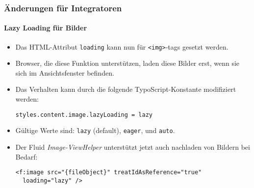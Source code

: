 
\begin{frame}[fragile]
	\frametitle{Änderungen für Integratoren}
	\framesubtitle{Lazy Loading für Bilder}

	\lstset{basicstyle=\smaller\ttfamily}

	\begin{itemize}
		\item Das HTML-Attribut \texttt{loading} kann nun für \texttt{<img>}-tags gesetzt werden.
		\item Browser, die diese Funktion unterstützen, laden diese Bilder erst, wenn sie sich im Ansichtsfenster befinden.
		\item Das Verhalten kann durch die folgende TypoScript-Konstante modifiziert werden:

\vspace{-0.4cm}
\begin{lstlisting}
styles.content.image.lazyLoading = lazy
\end{lstlisting}

		\item Gültige Werte sind: \texttt{lazy} (default), \texttt{eager}, und \texttt{auto}.
		\item Der Fluid \textit{Image-ViewHelper} unterstützt jetzt auch nachladen von Bildern bei Bedarf:

\vspace{-0.4cm}
\begin{lstlisting}
<f:image src="{fileObject}" treatIdAsReference="true"
  loading="lazy" />
\end{lstlisting}

	\end{itemize}

\end{frame}


